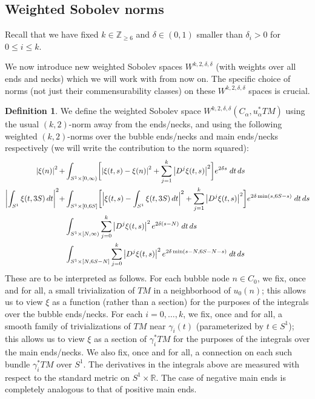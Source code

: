 \documentclass[12pt]{article}
\theoremstyle{definition}
\newtheorem{definition}[theorem]{Definition}
\theoremstyle{remark}
\numberwithin{equation}{subsection}
\newcommand{\ZZ}{\mathbb Z}
\newcommand{\RR}{\mathbb R}
\begin{document}
\subsection{Weighted Sobolev norms}

Recall that we have fixed $k\in\ZZ_{\geq 6}$ and $\delta\in(0,1)$ smaller than $\delta_i>0$ for $0\leq i\leq k$.

We now introduce new weighted Sobolev spaces $W^{k,2,\delta,\delta}$ (with weights over all ends and necks) which we will work with from now on.  The specific choice of norms (not just their commensurability classes) on these $W^{k,2,\delta,\delta}$ spaces is crucial.

\begin{definition}\label{weightedonespace}
We define the weighted Sobolev space $W^{k,2,\delta,\delta}(C_\alpha,u_\alpha^\ast TM)$ using the usual $(k,2)$-norm away from the ends/necks, and using the following weighted $(k,2)$-norms over the bubble ends/necks and main ends/necks respectively (we will write the contribution to the norm squared):
\begin{align}
\label{endnormHFbubble}\left|\xi(n)\right|^2+&\int_{S^1\times[0,\infty)}\biggl[\left|\xi(t,s)-\xi(n)\right|^2+\sum_{j=1}^k\left|D^j\xi(t,s)\right|^2\biggr]e^{2\delta s}\;dt\,ds\\
\label{necknormHFbubble}\biggl|\int_{S^1}\xi(t,3S)\,dt\biggr|^2+&\int_{S^1\times[0,6S]}\biggl[\Bigl|\xi(t,s)-\int_{S^1}\xi(t,3S)\,dt\Bigr|^2+\sum_{j=1}^k\left|D^j\xi(t,s)\right|^2\biggr]e^{2\delta\min(s,6S-s)}\;dt\,ds\\
\label{endnormHFmain}&\int_{S^1\times[N,\infty)}\sum_{j=0}^k\left|D^j\xi(t,s)\right|^2e^{2\delta(s-N)}\;dt\,ds\\
\label{necknormHFmain}&\int_{S^1\times[N,6S-N]}\sum_{j=0}^k\left|D^j\xi(t,s)\right|^2e^{2\delta\min(s-N,6S-N-s)}\;dt\,ds
\end{align}
These are to be interpreted as follows.  For each bubble node $n\in C_0$, we fix, once and for all, a small trivialization of $TM$ in a neighborhood of $u_0(n)$; this allows us to view $\xi$ as a function (rather than a section) for the purposes of the integrals over the bubble ends/necks.  For each $i=0,\ldots,k$, we fix, once and for all, a smooth family of trivializations of $TM$ near $\gamma_i(t)$ (parameterized by $t\in S^1$); this allows us to view $\xi$ as a section of $\gamma_i^\ast TM$ for the purposes of the integrals over the main ends/necks.  We also fix, once and for all, a connection on each such bundle $\gamma_i^\ast TM$ over $S^1$.  The derivatives in the integrals above are measured with respect to the standard metric on $S^1\times\RR$.  The case of negative main ends is completely analogous to that of positive main ends.  


\end{definition}
\end{document}
